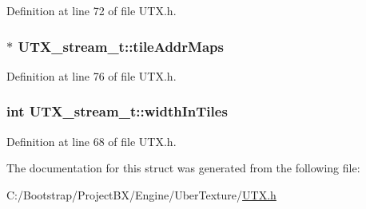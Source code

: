 Definition at line 72 of file UTX.h.\hypertarget{struct_u_t_x__stream__t_0c0ce07983b8865fdde4e694261caa3e}{
\subsubsection[{tileAddrMaps}]{$\ast$ {\bf UTX\_\-stream\_\-t::tileAddrMaps}}}
\label{struct_u_t_x__stream__t_0c0ce07983b8865fdde4e694261caa3e}




Definition at line 76 of file UTX.h.\hypertarget{struct_u_t_x__stream__t_cb6233f004f9bb35c5ad003e20fa5ef1}{
\subsubsection[{widthInTiles}]{\setlength{\rightskip}{0pt plus 5cm}int {\bf UTX\_\-stream\_\-t::widthInTiles}}}
\label{struct_u_t_x__stream__t_cb6233f004f9bb35c5ad003e20fa5ef1}




Definition at line 68 of file UTX.h.

The documentation for this struct was generated from the following file:\begin{CompactItemize}
\item 
C:/Bootstrap/ProjectBX/Engine/UberTexture/\hyperlink{_u_t_x_8h}{UTX.h}\end{CompactItemize}
